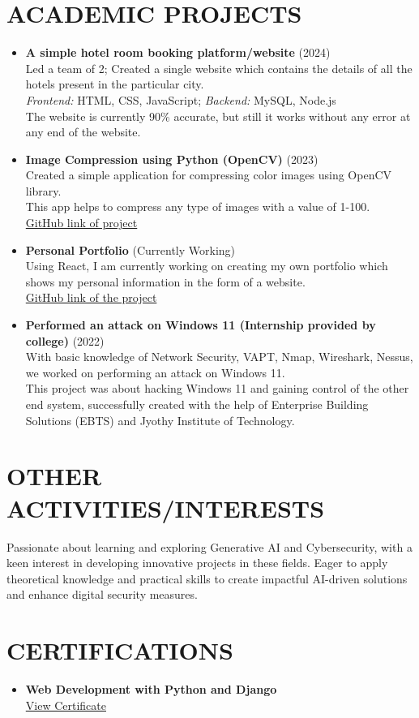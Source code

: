 \documentclass[a4paper,10pt]{article}
\begin{document}
\section*{ACADEMIC PROJECTS}
\begin{itemize}[leftmargin=0.3cm, itemsep=0pt, topsep=0pt]
    \item \textbf{A simple hotel room booking platform/website} (2024) \\
    Led a team of 2; Created a single website which contains the details of all the hotels present in the particular city. \\
    \textit{Frontend:} HTML, CSS, JavaScript; \textit{Backend:} MySQL, Node.js \\
    The website is currently 90\% accurate, but still it works without any error at any end of the website.

    \item \textbf{Image Compression using Python (OpenCV)} (2023) \\
    Created a simple application for compressing color images using OpenCV library. \\
    This app helps to compress any type of images with a value of 1-100. \\
    \href{https://github.com/sumukhavasista/image_compression}{GitHub link of project}

    \item \textbf{Personal Portfolio} (Currently Working) \\
    Using React, I am currently working on creating my own portfolio which shows my personal information in the form of a website. \\
    \href{https://github.com/sumukhavasista/my-portfolio}{GitHub link of the project}

    \item \textbf{Performed an attack on Windows 11 (Internship provided by college)} (2022) \\
    With basic knowledge of Network Security, VAPT, Nmap, Wireshark, Nessus, we worked on performing an attack on Windows 11. \\
    This project was about hacking Windows 11 and gaining control of the other end system, successfully created with the help of Enterprise Building Solutions (EBTS) and Jyothy Institute of Technology.
\end{itemize}

\section*{OTHER ACTIVITIES/INTERESTS}
Passionate about learning and exploring Generative AI and Cybersecurity, with a keen interest in developing innovative projects in these fields. Eager to apply theoretical knowledge and practical skills to create impactful AI-driven solutions and enhance digital security measures.

\section*{CERTIFICATIONS}
\begin{itemize}[leftmargin=0.3cm, itemsep=0pt, topsep=0pt]
    \item \textbf{Web Development with Python and Django} \\
    \href{https://www.udemy.com/certificate/UC-22045d1d-ebe3-4771-855e-86a40fee6b02/}{View Certificate}
\end{itemize}
\end{document}
